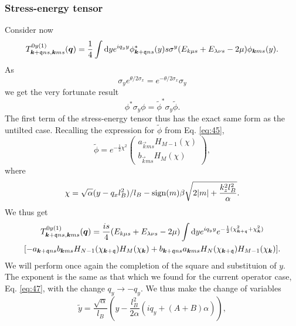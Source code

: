 \subsubsection{Stress-energy tensor}
Consider now
\begin{equation}
  \label{eq:33}
  T_{\bm{k} + \mathfrak{q} n s, \bm{k} m s}^{0y(1)} (\bm{q}) =
  \frac{1}{4}
  \int \mathrm{d} y
  e^{i q_{y} y}
  \phi ^{*}_{\bm{k} + \mathfrak{q} n s}(y) s \sigma ^{y}
  (E_{k \mu  s} + E_{\lambda \nu s} - 2 \mu)
  \phi _{\bm{k} m s} (y).
\end{equation}
As
\begin{equation}
  \label{eq:34}
  \sigma _{y} e^{\theta /2 \sigma _{x}} = e^{-\theta /2 \sigma _{x}} \sigma _{y}
\end{equation}
we get the very fortunate result
\begin{equation}
  \label{eq:35}
  \phi^{*} \sigma _{y} \phi = \tilde{\phi}^{*} \sigma _{y} \tilde{\phi}.
\end{equation}
The first term of the stress-energy tensor thus has the exact same form as the untilted case.
Recalling the expression for \(\tilde{\phi}\) from Eq. \eqref{eq:45},
\[
  \tilde{\phi} = e^{-\frac{1}{2} \chi ^2}
  \begin{pmatrix}
    a_{\vec{k} m s} H_{M-1} (\chi)\\
    b_{\vec{k} m s} H_{M} (\chi)
  \end{pmatrix},
\]
where
\[
\chi = \sqrt{\alpha} (y - q_{x} l_{B}^2 ) /l_{B} - \operatorname{sign}(m) \beta \sqrt{2 |m| + \frac{k_{z}^2 l_{B}^2}{\alpha }}.
\]
We thus get
\begin{multline}
  \label{eq:48}
  T_{\vec{k}+\qvec{q} ns, \vec{k} m s}^{0y (1)} (\vec{q}) =
  \frac{is}{4} (E_{k\mu  s} + E_{\lambda \nu s} - 2 \mu)
  \int \mathrm{d} y
  e^{i q_{y} y}
  e^{-\frac{1}{2} (\chi_{\vec{k}+\qvec{q}}^2 + \chi_{\vec{k}} ^2) }\\
  [
  -a_{\vec{k} + \qvec{q} ns} b_{\vec{k} m s} H_{N-1} (\chi_{\vec{k} + \qvec{q}}) H_{M} (\chi_{\vec{k}})
  + b_{\vec{k} + \qvec{q} n s} a_{\vec{k} ms} H_{N}(\chi_{\vec{k} + \qvec{q}}) H_{M-1} (\chi_{\vec{k}})
  ].
\end{multline}
We will perform once again the completion of the square and substituion of \(y\).
The exponent is the same as that which we found for the current operator case, Eq. \eqref{eq:47}, with the change \(q_{y} \to - q_{y}\).
We thus make the change of variables
\begin{equation}
  \label{eq:49}
  \tilde{y} = \frac{\sqrt{\alpha}}{l_{B}} \left(y  - \frac{l_{B}^2}{2 \alpha } (i q_{y} + (A + B) \alpha )\right),
\end{equation}
